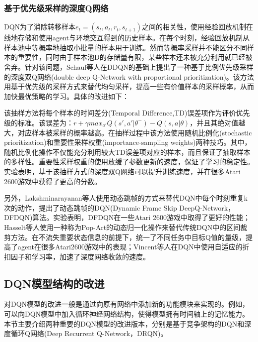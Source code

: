 \documentclass[bachelor]{thesis-uestc}
\begin{document}
	\subsubsection{基于优先级采样的深度Q网络}
	DQN为了消除转移样本$e_t=(s_t,a_t,r_t,s_{t+1})$之间的相关性，使用经验回放机制\cite{lin1993reinforcement}在线地存储和使用agent与环境交互得到的历史样本。在每个时刻，经验回放机制从样本池中等概率地抽取小批量的样本用于训练。然而等概率采样并不能区分不同样本的重要性，同时由于样本池D的存储量有限，某些样本还未被充分利用就已经被舍弃。针对该问题，Schaul\cite{schaul2015prioritized}等人在DDQN的基础上提出了一种基于比例优先级采样的深度双Q网络(double deep Q-Network with proportional prioritization)。该方法用基于优先级的采样方式来替代均匀采样，提高一些有价值样本的采样概率，从而加快最优策略的学习。具体的改进如下：

	该抽样方法将每个样本的时间差分(Temporal Difference,TD)误差项作为评价优先级的标准。该误差为：$r+\gamma max_{a'}Q(s',a'|\theta^-)-Q(s,a|\theta)$，并且其绝对值越大，对应样本被采样的概率越高。在抽样过程中该方法使用随机比例化(stochastic prioritization)和重要性采样权重(importance-sampling weights)两种技巧。其中，随机比例化操作不仅能充分利用较大TD误差项对应的样本，而且保证了抽取样本的多样性。重要性采样权重的使用放缓了参数更新的速度，保证了学习的稳定性。实验表明，基于该抽样方式的深度双Q网络可以提升训练速度，并在很多Atari 2600游戏中获得了更高的分数。
	
	另外，Lakshminarayanan等人\cite{lakshminarayanan2016dynamic}使用动态跳帧的方式来替代DQN中每个时刻重复k次的动作，提出了动态跳帧的DQN(Dynamic Frame Skip DeepQ-Network，DFDQN)算法。实验表明，DFDQN在一些Atari 2600游戏中取得了更好的性能；Hasselt\cite{van2016learning}等人使用一种称为Pop-Art的动态归一化操作来替代传统DQN中的区间裁剪方法。在不流失重要状态信息的前提下，统一了不同任务中目标Q值的量级，提高了agent在很多Atari2600游戏中的表现；Vincent等人\cite{franccois2015discount}在DQN中使用自适应的折扣因子和学习率，加速了深度网络收敛的速度。
	
	\subsection{DQN模型结构的改进}
	对DQN模型的改进一般是通过向原有网络中添加新的功能模块来实现的。例如，可以向DQN模型中加入循环神经网络结构，使得模型拥有时间轴上的记忆能力。本节主要介绍两种重要的DQN模型的改进版本，分别是基于竞争架构的DQN和深度循环Q网络(Deep Recurrent Q-Network，DRQN)。
\end{document}
